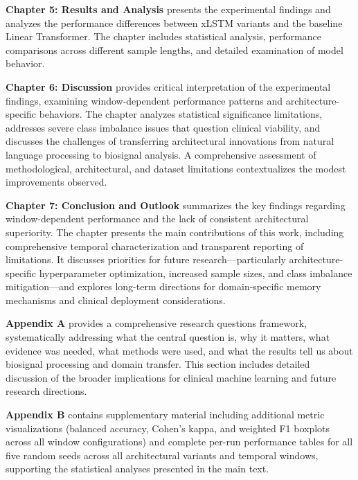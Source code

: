 \textbf{Chapter 5: Results and Analysis} presents the experimental findings and analyzes the performance differences between \ac{xLSTM} variants and the baseline Linear Transformer. The chapter includes statistical analysis, performance comparisons across different sample lengths, and detailed examination of model behavior.

\textbf{Chapter 6: Discussion} provides critical interpretation of the experimental findings, examining window-dependent performance patterns and architecture-specific behaviors. The chapter analyzes statistical significance limitations, addresses severe class imbalance issues that question clinical viability, and discusses the challenges of transferring architectural innovations from natural language processing to biosignal analysis. A comprehensive assessment of methodological, architectural, and dataset limitations contextualizes the modest improvements observed.

\textbf{Chapter 7: Conclusion and Outlook} summarizes the key findings regarding window-dependent performance and the lack of consistent architectural superiority. The chapter presents the main contributions of this work, including comprehensive temporal characterization and transparent reporting of limitations. It discusses priorities for future research---particularly architecture-specific hyperparameter optimization, increased sample sizes, and class imbalance mitigation---and explores long-term directions for domain-specific memory mechanisms and clinical deployment considerations.

\textbf{Appendix A} provides a comprehensive research questions framework, systematically addressing what the central question is, why it matters, what evidence was needed, what methods were used, and what the results tell us about biosignal processing and domain transfer. This section includes detailed discussion of the broader implications for clinical machine learning and future research directions.

\textbf{Appendix B} contains supplementary material including additional metric visualizations (balanced accuracy, Cohen's kappa, and weighted F1 boxplots across all window configurations) and complete per-run performance tables for all five random seeds across all architectural variants and temporal windows, supporting the statistical analyses presented in the main text.



